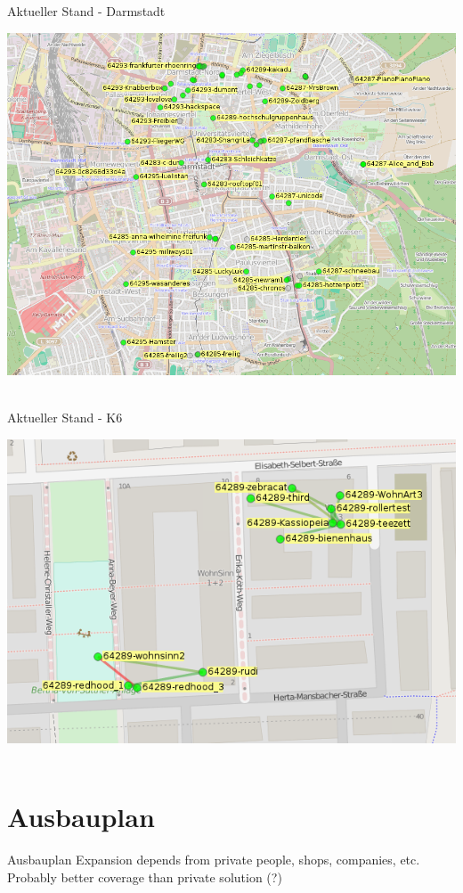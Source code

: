 \documentclass{beamer}
\begin{document}
\begin{frame}{Aktueller Stand - Darmstadt}
\vfill
\begin{center}
\includegraphics[height=0.75\textheight]{images/2015-01-26-darmstadt}$\;$
\vfill
\end{center}
\end{frame}

\begin{frame}{Aktueller Stand - K6}
\vfill
\begin{center}
\includegraphics[height=0.75\textheight]{images/2015-01-26-wohnart3}$\;$
\vfill
\end{center}
\end{frame}

\section{Ausbauplan}
\begin{frame}{Ausbauplan}
Expansion depends from private people, shops, companies, etc.
Probably better coverage than private solution (?)
\end{frame}
\end{document}
